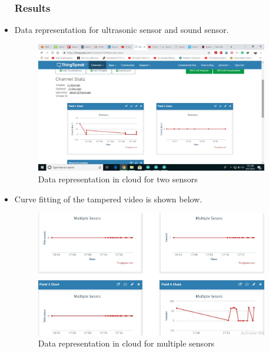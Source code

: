 \documentclass{beamer}
\begin{document}
\begin{frame}
\begin{itemize}\frametitle{Results}
\item Data representation for ultrasonic sensor and sound sensor.
  \begin{figure}[H]
  \centerline{\includegraphics[width=4.0in]{two.JPG}}
  \caption{ \textbf{}Data representation in cloud for two sensors}
  \end{figure}
\end{itemize}
\end{frame}
\begin{frame}
\begin{itemize}
\item Curve fitting of the tampered video is shown below.
  \begin{figure}[H]
  \centerline{\includegraphics[width=4.0in]{multiplesensor.JPG}}
  \caption{ \textbf{}Data representation in cloud for multiple sensors}
  \end{figure}
\end{itemize}
\end{frame}
\end{document}
